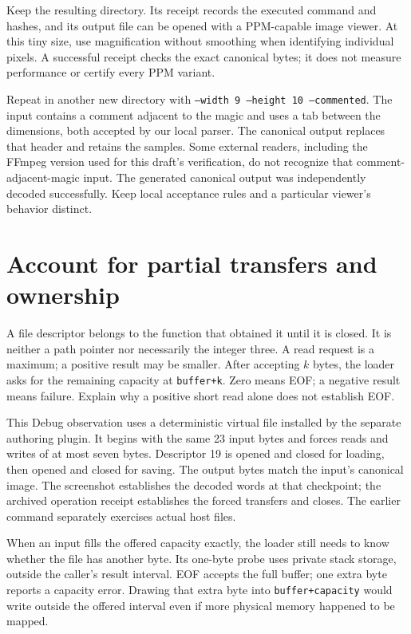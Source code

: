 Keep the resulting directory. Its receipt records the executed command and
hashes, and its output file can be opened with a PPM-capable image viewer. At
this tiny size, use magnification without smoothing when identifying individual
pixels. A successful receipt checks the exact canonical bytes; it does not
measure performance or certify every PPM variant.

Repeat in another new directory with \texttt{--width 9 --height 10 --commented}.
The input contains a comment adjacent to the magic and uses a tab between the
dimensions, both accepted by our local parser. The canonical output replaces
that header and retains the samples. Some external readers, including the
FFmpeg version used for this draft's verification, do not recognize that
comment-adjacent-magic input. The generated canonical output was independently
decoded successfully. Keep local acceptance rules and a particular viewer's
behavior distinct.

\section{Account for partial transfers and ownership}

A file descriptor belongs to the function that obtained it until it is closed.
It is neither a path pointer nor necessarily the integer three. A read request
is a maximum; a positive result may be smaller. After accepting $k$ bytes, the
loader asks for the remaining capacity at \texttt{buffer+k}. Zero means EOF;
a negative result means failure. Explain why a positive short read alone does
not establish EOF.



This Debug observation uses a deterministic virtual file installed by the
separate authoring plugin. It begins with the same 23 input bytes and forces
reads and writes of at most seven bytes. Descriptor 19 is opened and closed for
loading, then opened and closed for saving. The output bytes match the input's
canonical image. The screenshot establishes the decoded words at that checkpoint;
the archived operation receipt establishes the forced transfers and closes.
The earlier command separately exercises actual host files.

When an input fills the offered capacity exactly, the loader still needs to
know whether the file has another byte. Its one-byte probe uses private stack
storage, outside the caller's result interval. EOF accepts the full buffer;
one extra byte reports a capacity error. Drawing that extra byte into
\texttt{buffer+capacity} would write outside the offered interval even if more
physical memory happened to be mapped.


